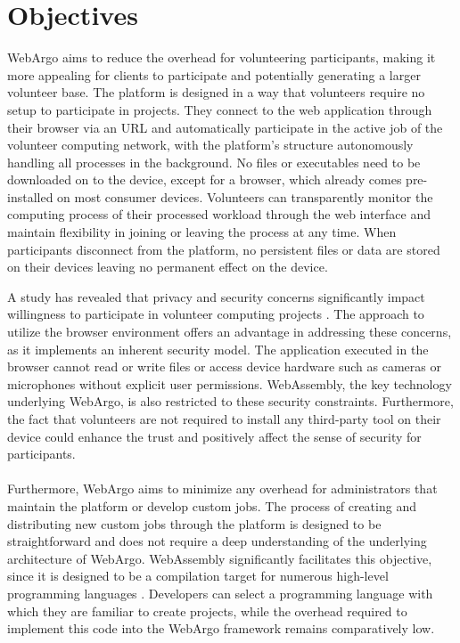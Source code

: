 \section{Objectives}
\label{sec:intro:objectives}
WebArgo aims to reduce the overhead for volunteering participants, making it more appealing for clients to participate and potentially generating a larger volunteer base. The platform is designed in a way that volunteers require no setup to participate in projects. They connect to the web application through their browser via an \acs{URL} and automatically participate in the active job of the volunteer computing network, with the platform's structure autonomously handling all processes in the background. No files or executables need to be downloaded on to the device, except for a browser, which already comes pre-installed on most consumer devices. Volunteers can transparently monitor the computing process of their processed workload through the web interface and maintain flexibility in joining or leaving the process at any time. When participants disconnect from the platform, no persistent files or data are stored on their devices leaving no permanent effect on the device.

A study has revealed that privacy and security concerns significantly impact willingness to participate in volunteer computing projects \cite{intro:volunteerStudy}. The approach to utilize the browser environment offers an advantage in addressing these concerns, as it implements an inherent security model. The application executed in the browser cannot read or write files or access device hardware such as cameras or microphones without explicit user permissions. WebAssembly, the key technology underlying WebArgo, is also restricted to these security constraints. Furthermore, the fact that volunteers are not required to install any third-party tool on their device could enhance the trust and positively affect the sense of security for participants.
\\~\\
Furthermore, WebArgo aims to minimize any overhead for administrators that maintain the platform or develop custom jobs. The process of creating and distributing new custom jobs through the platform is designed to be straightforward and does not require a deep understanding of the underlying architecture of WebArgo. WebAssembly significantly facilitates this objective, since it is designed to be a compilation target for numerous high-level programming languages \cite{methodology:wasm, methodology:wasmW3C, methodology:wasmdocu, relatedwork:wasmedgecomputing}. Developers can select a programming language with which they are familiar to create projects, while the overhead required to implement this code into the WebArgo framework remains comparatively low. 

